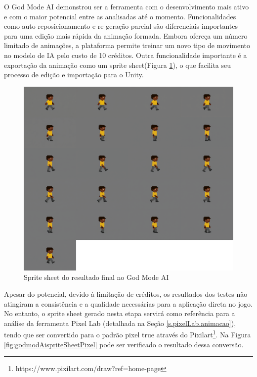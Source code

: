 O God Mode AI demonstrou ser a ferramenta com o desenvolvimento mais ativo e com o maior potencial entre as analisadas até o momento. Funcionalidades como auto reposicionamento e re-geração parcial são diferenciais importantes para uma edição mais rápida da animação formada. Embora ofereça um número limitado de animações, a plataforma permite treinar um novo tipo de movimento no modelo de IA pelo custo de 10 créditos. Outra funcionalidade importante é a exportação da animação como um sprite sheet(Figura \ref{fig:godmodAispriteSheet}), o que facilita seu processo de edição e importação para o Unity. %

\begin{figure}[htbp]
    \centering
    \caption{\small Sprite sheet do resultado final no God Mode AI}
    \label{fig:godmodAispriteSheet}
    \includegraphics[width=1\linewidth]{figs/godmodAI/sprite sheet.png}
\end{figure}

Apesar do potencial, devido à limitação de créditos, os resultados dos testes não atingiram a consistência e a qualidade necessárias para a aplicação direta no jogo. No entanto, o sprite sheet gerado nesta etapa servirá como referência para a análise da ferramenta Pixel Lab (detalhada na Seção \ref{s.pixelLab.animacao}), tendo que ser convertido para o padrão pixel true através do Pixilart\footnote{https://www.pixilart.com/draw?ref=home-page}. Na Figura \ref{fig:godmodAispriteSheetPixel} pode ser verificado o resultado dessa conversão.

